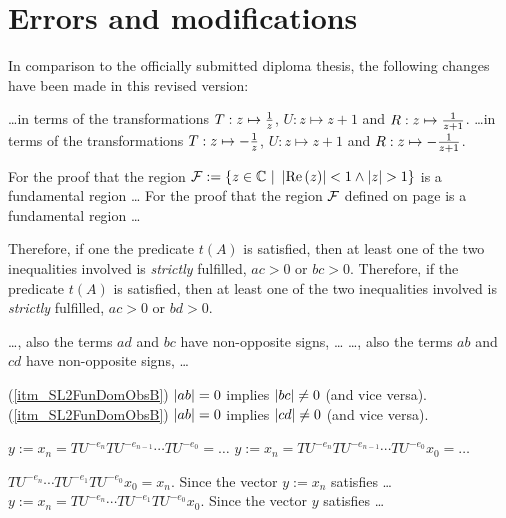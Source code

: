 \chapter{Errors and modifications}

In comparison to the officially submitted diploma thesis, the following changes have been made in this revised version:

\begin{description}
{\dots in terms of the transformations $T : z \mapsto \frac{1}{z}$, $U : z \mapsto z+1$ and $R : z \mapsto \frac{1}{z+1}$.}
{\dots in terms of the transformations $T : z \mapsto -\frac{1}{z}$, $U : z \mapsto z+1$ and $R : z \mapsto -\frac{1}{z+1}$.}

{For the proof that the region $\mathcal{F} := \{ z \in \mathbb{C} \ | \ \left|\operatorname{Re}\left(z\right)\right| < 1 \land \left|z\right| > 1 \}$ is a fundamental region \dots}
{For the proof that the region $\mathcal{F}$ defined on page \pageref{eqn_PSL2FunDom} is a fundamental region \dots}

{Therefore, if one the predicate $t(A)$ is satisfied, then at least one of the two inequalities involved is \emph{strictly} fulfilled, \ie $ac > 0$ or $bc > 0$.}
{Therefore, if the predicate $t(A)$ is satisfied, then at least one of the two inequalities involved is \emph{strictly} fulfilled, \ie $ac > 0$ or $bd > 0$.}

{\dots, \ie also the terms $ad$ and  $bc$ have non-opposite signs, \dots}
{\dots, \ie also the terms $ab$ and $cd$ have non-opposite signs, \dots}

{(\ref{itm_SL2FunDomObsB})\quad
$\left|ab\right| = 0$ implies $\left|bc\right| \ne 0$ (and vice versa).}
{(\ref{itm_SL2FunDomObsB})\quad
$\left|ab\right| = 0$ implies $\left|cd\right| \ne 0$ (and vice versa).}

{$y := x_n = TU^{-e_n} TU^{-e_{n-1}} \cdots TU^{-e_0} = \dots$}
{$y := x_n = TU^{-e_n} TU^{-e_{n-1}} \cdots TU^{-e_0} x_0 = \dots$}

{$TU^{-e_n} \cdots TU^{-e_1} TU^{-e_0} x_0 = x_n.$ \quad Since the vector $y := x_n$ satisfies \dots}
{$y := x_n = TU^{-e_n} \cdots TU^{-e_1} TU^{-e_0} x_0.$ \quad Since the vector $y$ satisfies \dots}


\end{description}
